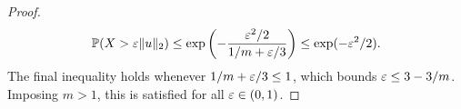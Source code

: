\begin{proof}
  \begin{equation} \label{eq: countsketch_bernstein}
    \mathbb{P} (X > \varepsilon \| u \|_2) \le \exp \left( - \frac{\varepsilon^2 /
    2}{1/m + \varepsilon /3 } \right)
    \le \exp(-\varepsilon^2/2).
  \end{equation}
  The final inequality holds whenever $1/m + \varepsilon / 3 \le 1$, which
  bounds $\varepsilon \le 3 - 3/m$.
Imposing $m>1$, this is satisfied for all $\varepsilon \in (0,1)$. 
\end{proof}


